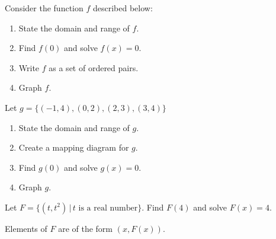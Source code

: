 \documentclass{ximera}
\begin{document}
\begin{problem}
Consider the function $f$ described below:

\begin{center}
\end{center}

\begin{enumerate}

\item  State  the domain and range of $f$.

\item Find $f(0)$ and solve $f(x) = 0$.

\item  Write $f$ as a set of ordered pairs.

\item  Graph $f$.

\end{enumerate}

\end{problem}

\begin{problem}
Let $g = \{ (-1,4), (0,2), (2, 3), (3,4)  \}$

\begin{enumerate}

\item  State the domain and range of $g$.

\item  Create a mapping diagram for $g$.

\item  Find $g(0)$ and solve $g(x) = 0$.

\item  Graph $g$.

\end{enumerate}
\end{problem}

\begin{problem}
Let $F = \{ (t, t^2) \, | \, \text{$t$ is a real number} \}$.  Find $F(4)$ and solve $F(x) = 4$.

\begin{hint}
Elements of $F$ are of the form $(x, F(x))$.
\end{hint}
\end{problem}
\end{document}
